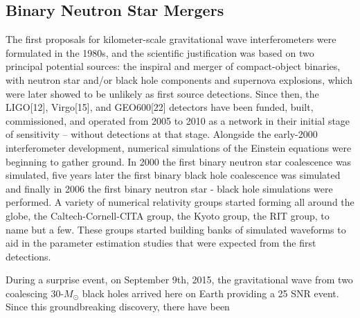 \documentclass{ut-thesis}
\begin{document}
\subsection{Binary Neutron Star Mergers}

The first proposals for kilometer-scale gravitational wave interferometers were
formulated in the 1980s, and the scientific justification was based on two principal
potential sources:  the inspiral and merger of compact-object binaries, with neutron star and/or
black hole components and supernova explosions, which were later showed to be unlikely as first source detections. Since
then, the LIGO[12], Virgo[15], and GEO600[22] detectors have been funded,
built, commissioned, and operated from 2005 to 2010 as a network in their initial
stage of sensitivity – without detections at that stage. Alongside the early-2000 interferometer development,
numerical simulations of the Einstein equations were beginning to gather ground. In 2000 the first
binary neutron star coalescence was simulated, five years later the first binary black hole coalescence
was simulated and finally in 2006 the first binary neutron star - black hole simulations were performed.
A variety of numerical relativity groups started forming all around the globe, the Caltech-Cornell-CITA group,
the Kyoto group, the RIT group, to name but a few. These groups started building banks of simulated waveforms
to aid in the parameter estimation studies that were expected from the first detections.

During a surprise event, on September 9th, 2015, the gravitational wave from two coalescing 30-$M_\odot$ black holes
arrived here on Earth providing a 25 SNR event. Since this groundbreaking discovery, there have been 
\end{document}
